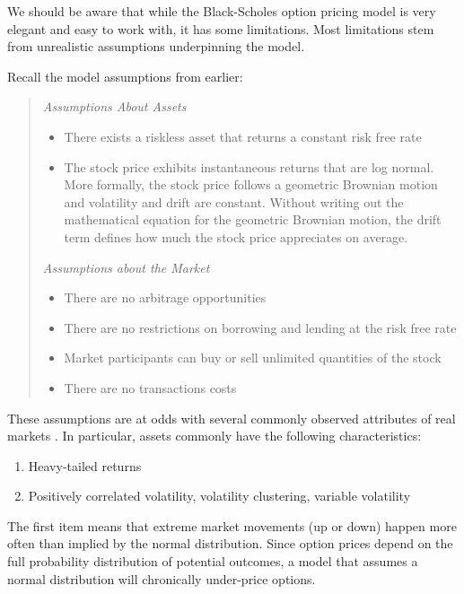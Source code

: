 \documentclass[
  letterpaper,
  DIV=11,
  numbers=noendperiod]{scrreprt}
\providecommand{\tightlist}{%
  \setlength{\itemsep}{0pt}\setlength{\parskip}{0pt}}\usepackage{longtable,booktabs,array}
\begin{document}
We should be aware that while the Black-Scholes option pricing model is
very elegant and easy to work with, it has some limitations. Most
limitations stem from unrealistic assumptions underpinning the model.

Recall the model assumptions from earlier:

\begin{quote}
\emph{Assumptions About Assets}

\begin{itemize}
\item
  There exists a riskless asset that returns a constant risk free rate
\item
  The stock price exhibits instantaneous returns that are log normal.
  More formally, the stock price follows a geometric Brownian motion and
  volatility and drift are constant. Without writing out the
  mathematical equation for the geometric Brownian motion, the drift
  term defines how much the stock price appreciates on average.
\end{itemize}

\emph{Assumptions about the Market}

\begin{itemize}
\item
  There are no arbitrage opportunities
\item
  There are no restrictions on borrowing and lending at the risk free
  rate
\item
  Market participants can buy or sell unlimited quantities of the stock
\item
  There are no transactions costs
\end{itemize}
\end{quote}

These assumptions are at odds with several commonly observed attributes
of real markets . In particular, assets commonly have the following
characteristics:

\begin{enumerate}
\def\labelenumi{\arabic{enumi}.}
\tightlist
\item
  Heavy-tailed returns
\item
  Positively correlated volatility, volatility clustering, variable
  volatility
\end{enumerate}

The first item means that extreme market movements (up or down) happen
more often than implied by the normal distribution. Since option prices
depend on the full probability distribution of potential outcomes, a
model that assumes a normal distribution will chronically under-price
options.
\end{document}
